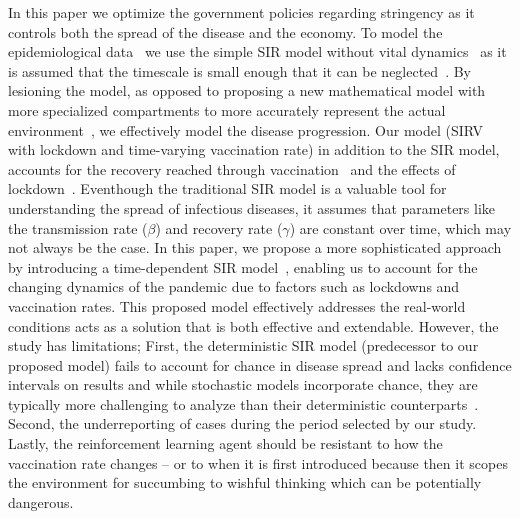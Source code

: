 \documentclass[tikz,fleqn,12pt]{wlscirep}
\begin{document}
In this paper we optimize the government policies regarding stringency as it controls both the spread of the disease and the economy. To model the epidemiological data~\cite{WorldometerCorona} we use the simple SIR model without vital dynamics~\cite{Hethcote1989, Hethcote2008, ALLEN2017128} as it is assumed that the timescale is small enough that it can be neglected~\cite{Cooper2020}. By lesioning the model, as opposed to proposing a new mathematical model with more specialized compartments to more accurately represent the actual environment~\cite{Bjrnstad2020, Mwalili2020}, we effectively model the disease progression. Our model (SIRV with lockdown and time-varying vaccination rate) in addition to the SIR model, accounts for the recovery reached through vaccination~\cite{Marinov2022,MaurciodeCarvalho2023,Thater,Turkyilmazoglu2022,YALADANDA2022101052} and the effects of lockdown~\cite{Hale2021,SIRLockdown,NBERw26981,NBERw26867}. Eventhough the traditional SIR model is a valuable tool for understanding the spread of infectious diseases, it assumes that parameters like the transmission rate ($\beta$) and recovery rate ($\gamma$) are constant over time, which may not always be the case. In this paper, we propose a more sophisticated approach by introducing a time-dependent SIR model~\cite{TimeDependentSIR}, enabling us to account for the changing dynamics of the pandemic due to factors such as lockdowns and vaccination rates. This proposed model effectively addresses the real-world conditions acts as a solution that is both effective and extendable. However, the study has limitations; First, the deterministic SIR model (predecessor to our proposed model) fails to account for chance in disease spread and lacks confidence intervals on results and while stochastic models incorporate chance, they are typically more challenging to analyze than their deterministic counterparts~\cite{Hethcote2008}. Second, the underreporting of cases during the period selected by our study. Lastly, the reinforcement learning agent should be resistant to how the vaccination rate changes -- or to when it is first introduced because then it scopes the environment for succumbing to wishful thinking which can be  potentially dangerous.
\end{document}
